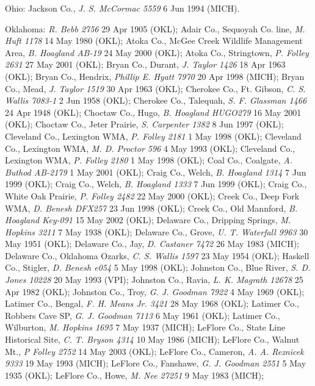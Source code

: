 \documentclass{article}
\begin{document}
Ohio:
Jackson Co., \textit{J. S. McCormac 5559} 6 Jun 1994 (MICH). 

Oklahoma:
\textit{R. Bebb 2756} 29 Apr 1905 (OKL); 
Adair Co., Sequoyah Co. line, \textit{M. Huft 1178} 14 May 1980 (OKL); 
Atoka Co., McGee Creek Wildlife Management Area, \textit{B. Hoagland AB-19} 24 May 2000 (OKL); 
Atoka Co., Stringtown, \textit{P. Folley 2631} 27 May 2001 (OKL); 
Bryan Co., Durant, \textit{J. Taylor 1426} 18 Apr 1963 (OKL); 
Bryan Co., Hendrix, \textit{Phillip E. Hyatt 7970} 20 Apr 1998 (MICH); 
Bryan Co., Mead, \textit{J. Taylor 1519} 30 Apr 1963 (OKL); 
Cherokee Co., Ft. Gibson, \textit{C. S. Wallis 7083-1} 2 Jun 1958 (OKL); 
Cherokee Co., Talequah, \textit{S. F. Glassman 1466} 24 Apr 1948 (OKL); 
Choctaw Co., Hugo, \textit{B. Hoagland HUGO279} 16 May 2001 (OKL); 
Choctaw Co., Jeter Prairie, \textit{S. Carpenter 1382} 8 Jun 1997 (OKL); 
Cleveland Co., Lexington WMA, \textit{P. Folley 2181} 1 May 1998 (OKL); 
Cleveland Co., Lexington WMA, \textit{M. D. Proctor 596} 4 May 1993 (OKL); 
Cleveland Co., Lexington WMA, \textit{P. Folley 2180} 1 May 1998 (OKL); 
Coal Co., Coalgate, \textit{A. Buthod AB-2179} 1 May 2001 (OKL); 
Craig Co., Welch, \textit{B. Hoagland 1314} 7 Jun 1999 (OKL); 
Craig Co., Welch, \textit{B. Hoagland 1333} 7 Jun 1999 (OKL); 
Craig Co., White Oak Prairie, \textit{P. Folley 2482} 22 May 2000 (OKL); 
Creek Co., Deep Fork WMA, \textit{D. Benesh DFX257} 23 Jun 1998 (OKL); 
Creek Co., Old Mannford, \textit{B. Hoagland Key-091} 15 May 2002 (OKL); 
Delaware Co., Dripping Springs, \textit{M. Hopkins 3211} 7 May 1938 (OKL); 
Delaware Co., Grove, \textit{U. T. Waterfall 9963} 30 May 1951 (OKL); 
Delaware Co., Jay, \textit{D. Castaner 7472} 26 May 1983 (MICH); 
Delaware Co., Oklahoma Ozarks, \textit{C. S. Wallis 1597} 23 May 1954 (OKL); 
Haskell Co., Stigler, \textit{D. Benesh e054} 5 May 1998 (OKL); 
Johnston Co., Blue River, \textit{S. D. Jones 10228} 20 May 1993 (VPI); 
Johnston Co., Ravia, \textit{L. K. Magrath 12678} 25 Apr 1982 (OKL); 
Johnston Co., Troy, \textit{G. J. Goodman 7922} 4 May 1969 (OKL); 
Latimer Co., Bengal, \textit{F. H. Means Jr. 3421} 28 May 1968 (OKL); 
Latimer Co., Robbers Cave SP, \textit{G. J. Goodman 7113} 6 May 1961 (OKL); 
Latimer Co., Wilburton, \textit{M. Hopkins 1695} 7 May 1937 (MICH); 
LeFlore Co., State Line Historical Site, \textit{C. T. Bryson 4314} 10 May 1986 (MICH); 
LeFlore Co., Walnut Mt., \textit{P Folley 2752} 14 May 2003 (OKL); 
LeFlore Co., Cameron, \textit{A. A. Reznicek 9333} 19 May 1993 (MICH); 
LeFlore Co., Fanshawe, \textit{G. J. Goodman 2551} 5 May 1935 (OKL); 
LeFlore Co., Howe, \textit{M. Nee 27251} 9 May 1983 (MICH); 
\end{document}
